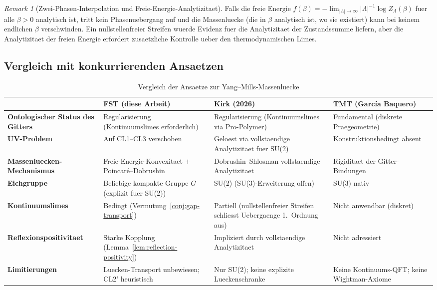 \documentclass[12pt,a4paper]{article}
\theoremstyle{definition}
\theoremstyle{plain}
\theoremstyle{remark}
\newtheorem{remark}[definition]{Remark}
\begin{document}
\begin{remark}[Zwei-Phasen-Interpolation und Freie-Energie-Analytizitaet]
\label{rem:two-phase}
Falls die freie Energie $f(\beta) = -\lim_{|\Lambda| \to \infty} |\Lambda|^{-1} \log Z_\Lambda(\beta)$ fuer alle $\beta > 0$ analytisch ist, tritt kein Phasenuebergang auf und die Massenluecke (die in $\beta$ analytisch ist, wo sie existiert) kann bei keinem endlichen $\beta$ verschwinden. Ein nullstellenfreier Streifen wuerde Evidenz fuer die Analytizitaet der Zustandssumme liefern, aber die Analytizitaet der freien Energie erfordert zusaetzliche Kontrolle ueber den thermodynamischen Limes.
\end{remark}

\subsection{Vergleich mit konkurrierenden Ansaetzen}

\begin{table}[htbp]
\centering
\scriptsize
\caption{Vergleich der Ansaetze zur Yang--Mills-Massenluecke}
\label{tab:comparison}
\setlength{\tabcolsep}{4pt}
\begin{tabularx}{\textwidth}{@{}L{3.6cm}Y Y Y@{}}
\toprule
& \textbf{FST (diese Arbeit)} & \textbf{Kirk (2026)} & \textbf{TMT (Garc\'ia Baquero)} \\
\midrule
\textbf{Ontologischer Status des Gitters} & Regularisierung (Kontinuumslimes erforderlich) & Regularisierung (Kontinuumslimes via Pro-Polymer) & Fundamental (diskrete Praegeometrie) \\
\midrule
\textbf{UV-Problem} & Auf CL1--CL3 verschoben & Geloest via vollstaendige Analytizitaet fuer SU(2) & Konstruktionsbedingt absent \\
\midrule
\textbf{Massenluecken-Mechanismus} & Freie-Energie-Konvexitaet $+$ Poincar\'e--Dobrushin & Dobrushin--Shlosman vollstaendige Analytizitaet & Rigiditaet der Gitter-Bindungen \\
\midrule
\textbf{Eichgruppe} & Beliebige kompakte Gruppe $G$ (explizit fuer SU(2)) & SU(2) (SU(3)-Erweiterung offen) & SU(3) nativ \\
\midrule
\textbf{Kontinuumslimes} & Bedingt (Vermutung~\ref{conj:gap-transport}) & Partiell (nullstellenfreier Streifen schliesst Uebergaenge 1.~Ordnung aus) & Nicht anwendbar (diskret) \\
\midrule
\textbf{Reflexionspositivitaet} & Starke Kopplung (Lemma~\ref{lem:reflection-positivity}) & Impliziert durch vollstaendige Analytizitaet & Nicht adressiert \\
\midrule
\textbf{Limitierungen} & Luecken-Transport unbewiesen; CL2' heuristisch & Nur SU(2); keine explizite Lueckenschranke & Keine Kontinuums-QFT; keine Wightman-Axiome \\
\bottomrule
\end{tabularx}
\end{table}
\end{document}
